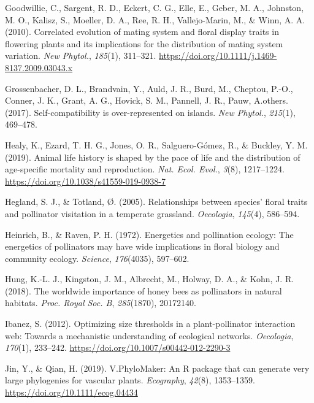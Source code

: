 \documentclass[
  12pt,
  a4paper,
]{article}
\newlength{\cslhangindent}
\newlength{\cslentryspacingunit} %
\newenvironment{CSLReferences}[2] %
 {%
  \setlength{\parindent}{0pt}
  \ifodd #1
  \let\oldpar\par
  \def\par{\hangindent=\cslhangindent\oldpar}
  \fi
  \setlength{\parskip}{#2\cslentryspacingunit}
 }%
 {}
\begin{document}
\begin{CSLReferences}{1}{0}
\leavevmode{}%
Goodwillie, C., Sargent, R. D., Eckert, C. G., Elle, E., Geber, M. A., Johnston, M. O., Kalisz, S., Moeller, D. A., Ree, R. H., Vallejo-Marin, M., \& Winn, A. A. (2010). Correlated evolution of mating system and floral display traits in flowering plants and its implications for the distribution of mating system variation. \emph{New Phytol.}, \emph{185}(1), 311--321. \url{https://doi.org/10.1111/j.1469-8137.2009.03043.x}

\leavevmode{}%
Grossenbacher, D. L., Brandvain, Y., Auld, J. R., Burd, M., Cheptou, P.-O., Conner, J. K., Grant, A. G., Hovick, S. M., Pannell, J. R., Pauw, A.others. (2017). Self-compatibility is over-represented on islands. \emph{New Phytol.}, \emph{215}(1), 469--478.

\leavevmode{}%
Healy, K., Ezard, T. H. G., Jones, O. R., Salguero-Gómez, R., \& Buckley, Y. M. (2019). Animal life history is shaped by the pace of life and the distribution of age-specific mortality and reproduction. \emph{Nat. Ecol. Evol.}, \emph{3}(8), 1217--1224. \url{https://doi.org/10.1038/s41559-019-0938-7}

\leavevmode{}%
Hegland, S. J., \& Totland, Ø. (2005). Relationships between species' floral traits and pollinator visitation in a temperate grassland. \emph{Oecologia}, \emph{145}(4), 586--594.

\leavevmode{}%
Heinrich, B., \& Raven, P. H. (1972). Energetics and pollination ecology: The energetics of pollinators may have wide implications in floral biology and community ecology. \emph{Science}, \emph{176}(4035), 597--602.

\leavevmode{}%
Hung, K.-L. J., Kingston, J. M., Albrecht, M., Holway, D. A., \& Kohn, J. R. (2018). The worldwide importance of honey bees as pollinators in natural habitats. \emph{Proc. Royal Soc. B}, \emph{285}(1870), 20172140.

\leavevmode{}%
Ibanez, S. (2012). Optimizing size thresholds in a plant-pollinator interaction web: Towards a mechanistic understanding of ecological networks. \emph{Oecologia}, \emph{170}(1), 233--242. \url{https://doi.org/10.1007/s00442-012-2290-3}

\leavevmode{}%
Jin, Y., \& Qian, H. (2019). V.{PhyloMaker}: An {R} package that can generate very large phylogenies for vascular plants. \emph{Ecography}, \emph{42}(8), 1353--1359. \url{https://doi.org/10.1111/ecog.04434}


\end{CSLReferences}
\end{document}
